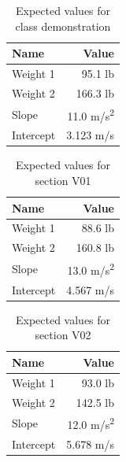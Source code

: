 %
\newpage
\begin{table}[ht]
    \centering
    \begin{tabular}{l|r}
        \textbf{Name} & \textbf{Value} \\
        \hline
        Weight 1 & 95.1 lb \\
        Weight 2 & 166.3 lb \\
        \hline
        Slope & 11.0 m/s\textsuperscript{2} \\
        Intercept & 3.123 m/s \\
        \hline
    \end{tabular}
    \caption{Expected values for class demonstration}
    \label{table:00.theoretical.demo}
\end{table}
%
\begin{table}[ht]
    \centering
    \begin{tabular}{l|r}
        \textbf{Name} & \textbf{Value} \\
        \hline
        Weight 1 & 88.6 lb \\
        Weight 2 & 160.8 lb \\
        \hline
        Slope & 13.0 m/s\textsuperscript{2} \\
        Intercept & 4.567 m/s \\
        \hline
    \end{tabular}
    \caption{Expected values for section V01}
    \label{table:00.theoretical.v01}
\end{table}
%
\begin{table}[ht]
    \centering
    \begin{tabular}{l|r}
        \textbf{Name} & \textbf{Value} \\
        \hline
        Weight 1 & 93.0 lb \\
        Weight 2 & 142.5 lb \\
        \hline
        Slope & 12.0 m/s\textsuperscript{2} \\
        Intercept & 5.678 m/s \\
        \hline
    \end{tabular}
    \caption{Expected values for section V02}
    \label{table:00.theoretical.v02}
\end{table}
\newpage
%
